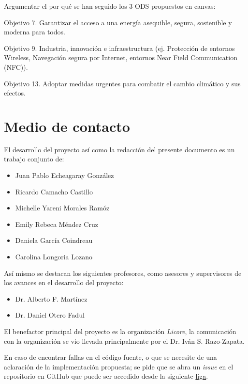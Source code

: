 \documentclass{article}
\begin{document}
        Argumentar el por qué se han seguido los 3 ODS propuestos en canvas:

        Objetivo 7. Garantizar el acceso a una energía asequible, segura, sostenible y moderna para todos.

        Objetivo 9. Industria, innovación e infraestructura (ej. Protección de entornos Wireless, Navegación segura por Internet, entornos Near Field Communication (NFC)).

        Objetivo 13. Adoptar medidas urgentes para combatir el cambio climático y sus efectos.

    \section{Medio de contacto}\label{sec:contact}

        El desarrollo del proyecto así como la redacción del presente documento es un trabajo conjunto de:
        \begin{itemize}
            \item Juan Pablo Echeagaray González
            \item Ricardo Camacho Castillo
            \item Michelle Yareni Morales Ramóz
            \item Emily Rebeca Méndez Cruz
            \item Daniela García Coindreau
            \item Carolina Longoria Lozano
        \end{itemize}

        Así mismo se destacan los siguientes profesores, como asesores y supervisores de los avances en el desarrollo del proyecto:
        \begin{itemize}
            \item Dr. Alberto F. Martínez
            \item Dr. Daniel Otero Fadul
        \end{itemize}

        El benefactor principal del proyecto es la organización \textit{Licore}, la comunicación con la organización se vio llevada principalmente por el Dr. Iván S. Razo-Zapata.

        En caso de encontrar fallas en el código fuente, o que se necesite de una aclaración de la implementación propuesta; se pide que se abra un \textit{issue} en el repositorio en GitHub que puede ser accedido desde la siguiente \href{https://github.com/JuanEcheagaray75/licore-pki}{liga}.

    \clearpage
    
    
\end{document}

